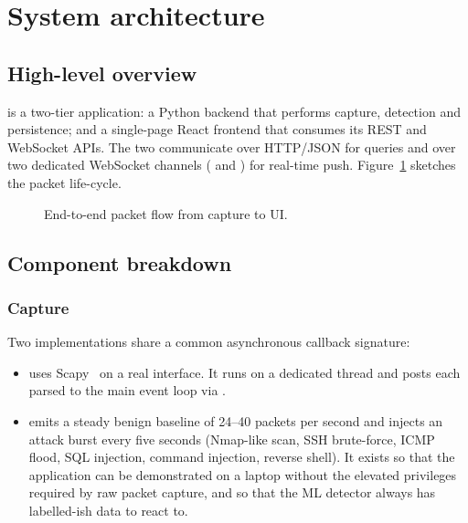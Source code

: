 \section{System architecture}
\label{sec:architecture}

\subsection{High-level overview}

\nidsname{} is a two-tier application: a Python backend that performs
capture, detection and persistence; and a single-page React frontend
that consumes its REST and WebSocket APIs. The two communicate over
HTTP/JSON for queries and over two dedicated WebSocket channels
( and ) for real-time push.
Figure~\ref{fig:dataflow} sketches the packet life-cycle.

\begin{figure}[h]
\centering
{}
\caption{End-to-end packet flow from capture to UI.}
\label{fig:dataflow}
\end{figure}

\subsection{Component breakdown}

\subsubsection{Capture}

Two implementations share a common asynchronous callback signature:
\begin{itemize}
    \item {} uses Scapy~\cite{scapy} on a real interface.
        It runs on a dedicated thread and posts each parsed
         to the main event loop via
        .
    \item {} emits a steady benign baseline of
        24--40 packets per second and injects an attack burst every
        five seconds (Nmap-like scan, SSH brute-force, ICMP flood, SQL
        injection, command injection, reverse shell). It exists so
        that the application can be demonstrated on a laptop without
        the elevated privileges required by raw packet capture, and so
        that the ML detector always has labelled-ish data to react to.
\end{itemize}

